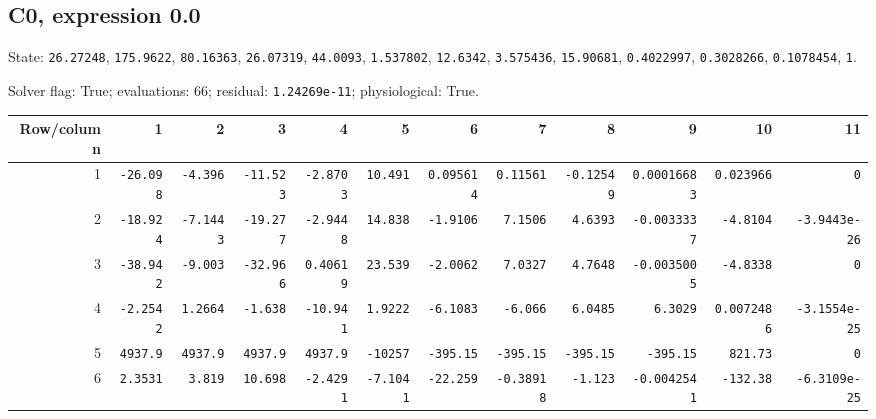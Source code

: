 \begin{landscape}
\subsection*{C0, expression 0.0}
{\scriptsize State: \texttt{26.27248}, \texttt{175.9622}, \texttt{80.16363}, \texttt{26.07319}, \texttt{44.0093}, \texttt{1.537802}, \texttt{12.6342}, \texttt{3.575436}, \texttt{15.90681}, \texttt{0.4022997}, \texttt{0.3028266}, \texttt{0.1078454}, \texttt{1}.\par

Solver flag: True; evaluations: 66; residual: \texttt{1.24269e-11}; physiological: True.\par}

\begingroup\scriptsize\setlength{\tabcolsep}{3pt}\centering
\begin{tabular}{rrrrrrrrrrrr}\toprule

Row/column & 1 & 2 & 3 & 4 & 5 & 6 & 7 & 8 & 9 & 10 & 11 \\ \midrule

1 & \texttt{-26.098} & \texttt{-4.396} & \texttt{-11.523} & \texttt{-2.8703} & \texttt{10.491} & \texttt{0.095614} & \texttt{0.11561} & \texttt{-0.12549} & \texttt{0.00016683} & \texttt{0.023966} & \texttt{0} \\

2 & \texttt{-18.924} & \texttt{-7.1443} & \texttt{-19.277} & \texttt{-2.9448} & \texttt{14.838} & \texttt{-1.9106} & \texttt{7.1506} & \texttt{4.6393} & \texttt{-0.0033337} & \texttt{-4.8104} & \texttt{-3.9443e-26} \\

3 & \texttt{-38.942} & \texttt{-9.003} & \texttt{-32.966} & \texttt{0.40619} & \texttt{23.539} & \texttt{-2.0062} & \texttt{7.0327} & \texttt{4.7648} & \texttt{-0.0035005} & \texttt{-4.8338} & \texttt{0} \\

4 & \texttt{-2.2542} & \texttt{1.2664} & \texttt{-1.638} & \texttt{-10.941} & \texttt{1.9222} & \texttt{-6.1083} & \texttt{-6.066} & \texttt{6.0485} & \texttt{6.3029} & \texttt{0.0072486} & \texttt{-3.1554e-25} \\

5 & \texttt{4937.9} & \texttt{4937.9} & \texttt{4937.9} & \texttt{4937.9} & \texttt{-10257} & \texttt{-395.15} & \texttt{-395.15} & \texttt{-395.15} & \texttt{-395.15} & \texttt{821.73} & \texttt{0} \\

6 & \texttt{2.3531} & \texttt{3.819} & \texttt{10.698} & \texttt{-2.4291} & \texttt{-7.1041} & \texttt{-22.259} & \texttt{-0.38918} & \texttt{-1.123} & \texttt{-0.0042541} & \texttt{-132.38} & \texttt{-6.3109e-25} \\


\end{tabular}
\end{landscape}
